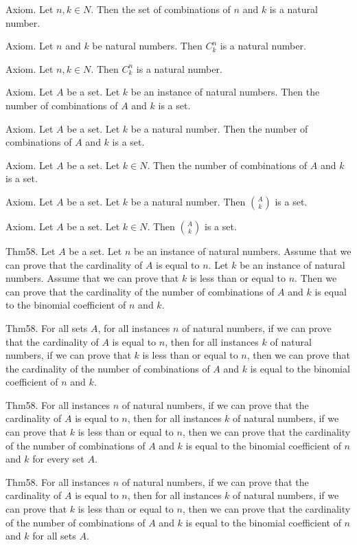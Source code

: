 \documentclass{article}
\begin{document}
Axiom. Let $n , k \in N$. Then the set of combinations of $n$ and $k$ is a natural number.

Axiom. Let $n$ and $k$ be natural numbers. Then $C^{ n }_{ k}$ is a natural number.

Axiom. Let $n , k \in N$. Then $C^{ n }_{ k}$ is a natural number.

Axiom. Let $A$ be a set. Let $k$ be an instance of natural numbers. Then the number of combinations of $A$ and $k$ is a set.

Axiom. Let $A$ be a set. Let $k$ be a natural number. Then the number of combinations of $A$ and $k$ is a set.

Axiom. Let $A$ be a set. Let $k \in N$. Then the number of combinations of $A$ and $k$ is a set.

Axiom. Let $A$ be a set. Let $k$ be a natural number. Then $\binom{ A }{ k}$ is a set.

Axiom. Let $A$ be a set. Let $k \in N$. Then $\binom{ A }{ k}$ is a set.

Thm58. Let $A$ be a set. Let $n$ be an instance of natural numbers. Assume that we can prove that the cardinality of $A$ is equal to $n$. Let $k$ be an instance of natural numbers. Assume that we can prove that $k$ is less than or equal to $n$. Then we can prove that the cardinality of the number of combinations of $A$ and $k$ is equal to the binomial coefficient of $n$ and $k$.

Thm58. For all sets $A$, for all instances $n$ of natural numbers, if we can prove that the cardinality of $A$ is equal to $n$, then for all instances $k$ of natural numbers, if we can prove that $k$ is less than or equal to $n$, then we can prove that the cardinality of the number of combinations of $A$ and $k$ is equal to the binomial coefficient of $n$ and $k$.

Thm58. For all instances $n$ of natural numbers, if we can prove that the cardinality of $A$ is equal to $n$, then for all instances $k$ of natural numbers, if we can prove that $k$ is less than or equal to $n$, then we can prove that the cardinality of the number of combinations of $A$ and $k$ is equal to the binomial coefficient of $n$ and $k$ for every set $A$.

Thm58. For all instances $n$ of natural numbers, if we can prove that the cardinality of $A$ is equal to $n$, then for all instances $k$ of natural numbers, if we can prove that $k$ is less than or equal to $n$, then we can prove that the cardinality of the number of combinations of $A$ and $k$ is equal to the binomial coefficient of $n$ and $k$ for all sets $A$.
\end{document}
